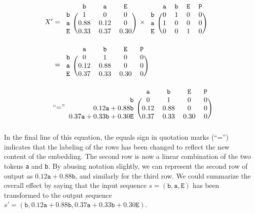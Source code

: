 \documentclass{article}
\newcommand{\ta}{\mathtt{a}}
\newcommand{\tb}{\mathtt{b}}
\newcommand{\tE}{\mathtt{E}}
\newcommand{\tP}{\mathtt{P}}
\begin{document}
\begin{displaymath}
\begin{aligned}
  X' &=  \begin{blockarray}{cccc}
       & \tb & \ta & \tE   \\
      \begin{block}{c(ccc)}
        \tb & 1 & 0 & 0  \\
        \ta & 0.88 & 0.12 & 0  \\
        \tE & 0.33 & 0.37 & 0.30  \\
      \end{block}
    \end{blockarray}
    \,\,\times
    \begin{blockarray}{ccccc}
       & \ta & \tb & \tE & \tP  \\
      \begin{block}{c(cccc)}
        \tb & 0 & 1 & 0 & 0 \\
        \ta & 1 & 0 & 0 & 0 \\
        \tE & 0 & 0 & 1 & 0 \\
      \end{block}
    \end{blockarray}   \\
    &= \begin{blockarray}{ccccc}
       & \ta & \tb & \tE & \tP  \\
      \begin{block}{r(cccc)}
        \tb & 0 & 1 & 0 & 0 \\
        \ta & 0.12 & 0.88 & 0 & 0 \\
        \tE & 0.37 & 0.33 & 0.30 & 0 \\
      \end{block}
    \end{blockarray}   \\
    &\text{``=''} \begin{blockarray}{ccccc}
       & \ta & \tb & \tE & \tP  \\
      \begin{block}{r(cccc)}
        \tb & 0 & 1 & 0 & 0 \\
        0.12\ta + 0.88\tb & 0.12 & 0.88 & 0 & 0 \\
        0.37\ta + 0.33\tb + 0.30\tE & 0.37 & 0.33 & 0.30 & 0 \\
      \end{block}
    \end{blockarray} \\
\end{aligned}
\end{displaymath}
In the final line of this equation, the equals sign in quotation marks
(``='') indicates that the labeling of the rows has been changed to
reflect the new content of the embedding. The second row is now a
linear combination of the two tokens \texttt{a} and \texttt{b}. By
abusing notation slightly, we can represent the second row of output
as $0.12\ta + 0.88\tb$, and similarly for the third row. We could
summarize the overall effect by saying that the input sequence
$s = (\tb, \ta, \tE)$ has been transformed to the output sequence
$s' = (\tb, 0.12\ta + 0.88\tb, 0.37\ta + 0.33\tb + 0.30\tE)$.
\end{document}

